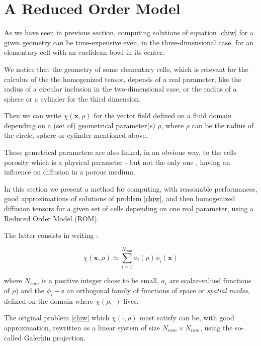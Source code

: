 \section{A Reduced Order Model}\label{rom}

As we have seen in previous section, computing solutions of equation \ref{chiw} for a given geometry %
can be time-expensive even, in the three-dimensional case, for an elementary cell with an euclidean bowl in its center.

\par
We notice that the geometry of some elementary cells, which is relevant for the calculus of the the homogenized tensor, %
depends of a real parameter, like the radius of a circular inclusion in the two-dimensional case, %
or the radius of a sphere or a cylinder for the third dimension.

\par
Then we can write $\chi(\mathbf{x},\rho)$ for the vector field defined on a fluid domain depending on a (set of) geometrical parameter(s) $\rho$, %
where $\rho$ can be the radius of the circle, sphere or cylinder mentioned above.

\par
Those gemetrical parameters are also linked, in an obvious way, to the cells porosity which is a physical parameter - but not the only one , %
having an influence on diffusion in a porous medium.

\par
In this section we present a method for computing, with reasonable performances, good approximations of solutions of problem \ref{chiw}, %
and then homogenized diffusion tensors for a given set of cells depending on one real parameter, using a Reduced Order Model (ROM).

\etoile
The latter consists in writing :

\begin{equation}
\label{rom_chi}
\chi(\mathbf{x},\rho)\simeq \sum\limits_{i=1}^{N_{rom}}a_i(\rho )\phi_i(\mathbf{x})
\end{equation}

where $N_{rom}$ is a positive integer chose to be small, $a_i$ are scalar-valued functions of $\rho )$ %
and the $\phi_i -$s an orthogonal family of functions of space or \emph{spatial modes}, defined on the domain where $\chi (\rho ,\cdot)$ lives.

\par
The original problem \ref{chiw} which $\chi (\cdot,\rho )$ must satisfy can be, with good approximation, rewritten as a linear system of size $N_{rom}\times N_{rom}$, %
using the so-called Galerkin projection.

